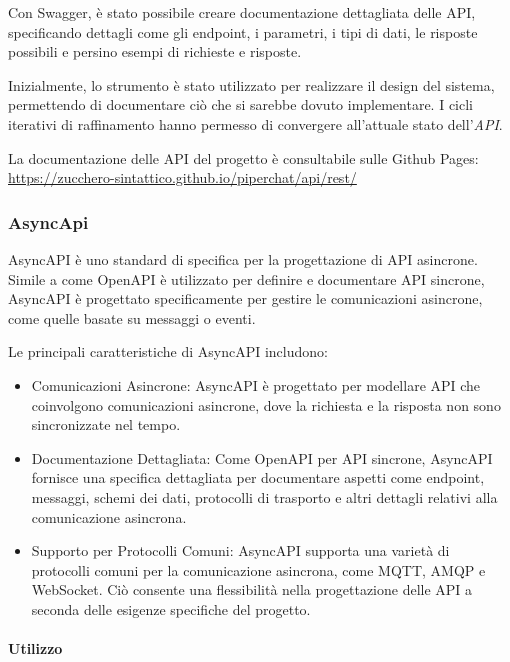 Con Swagger, è stato possibile creare documentazione dettagliata delle API, specificando dettagli come gli endpoint, i parametri, i tipi di dati, le risposte possibili e persino esempi di richieste e risposte.

Inizialmente, lo strumento è stato utilizzato per realizzare il design del sistema, permettendo di documentare ciò che si sarebbe dovuto implementare.
%
I cicli iterativi di raffinamento hanno permesso di convergere all'attuale stato dell'\emph{API}.

La documentazione delle API del progetto è consultabile sulle Github Pages:
\url{https://zucchero-sintattico.github.io/piperchat/api/rest/}

%
%
%
\subsubsection{AsyncApi}

AsyncAPI è uno standard di specifica per la progettazione di API asincrone.
%
Simile a come OpenAPI è utilizzato per definire e documentare API sincrone, AsyncAPI è progettato specificamente per gestire le comunicazioni asincrone, come quelle basate su messaggi o eventi.

Le principali caratteristiche di AsyncAPI includono:

\begin{itemize}
    \item Comunicazioni Asincrone: AsyncAPI è progettato per modellare API che coinvolgono comunicazioni asincrone, dove la richiesta e la risposta non sono sincronizzate nel tempo.

    \item Documentazione Dettagliata: Come OpenAPI per API sincrone, AsyncAPI fornisce una specifica dettagliata per documentare aspetti come endpoint, messaggi, schemi dei dati, protocolli di trasporto e altri dettagli relativi alla comunicazione asincrona.

    \item Supporto per Protocolli Comuni: AsyncAPI supporta una varietà di protocolli comuni per la comunicazione asincrona, come MQTT, AMQP e WebSocket. Ciò consente una flessibilità nella progettazione delle API a seconda delle esigenze specifiche del progetto.
\end{itemize}

%
%
%
\paragraph{Utilizzo}

